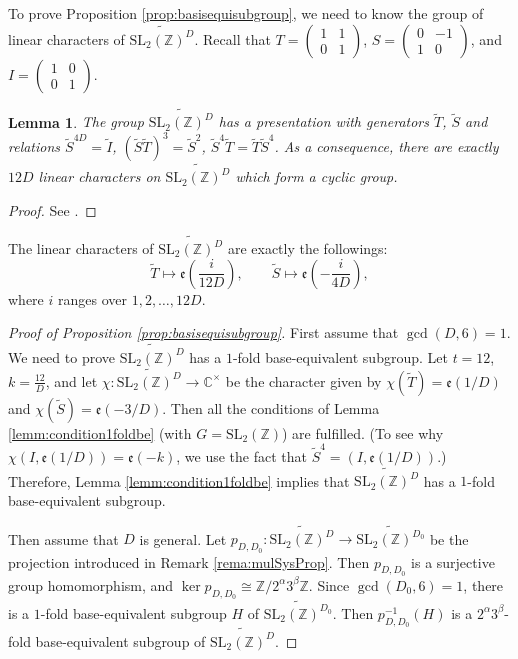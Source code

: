 \documentclass[12pt]{amsart}
\numberwithin{equation}{section}
\theoremstyle{plain}
\newtheorem{lemm}[thm]{Lemma}
\theoremstyle{definition}
\theoremstyle{remark}
\newcommand\tbtmat[4]{\left(\begin{smallmatrix}{#1} & {#2} \\ {#3} & {#4}\end{smallmatrix}\right)}
\newcommand\etp[1]{\mathfrak{e}\left(#1\right)}
\newcommand\numZ{\mathbb{Z}}
\newcommand\numC{\mathbb{C}}
\newcommand\slZ{\mathrm{SL}_2(\mathbb{Z})}
\newcommand\Dcover[2]{\widetilde{#1^{#2}}}
\begin{document}
\begin{appendix}
To prove Proposition \ref{prop:basisequisubgroup}, we need to know the group of linear characters of $\Dcover{\slZ}{D}$. Recall that $T=\tbtmat{1}{1}{0}{1}$, $S=\tbtmat{0}{-1}{1}{0}$, and $I=\tbtmat{1}{0}{0}{1}$.
\begin{lemm}{\cite[Lemma 5.2]{Zhu23}}
\label{lemm:presentationslZ}
The group $\Dcover{\slZ}{D}$ has a presentation with generators $\widetilde{T}$, $\widetilde{S}$ and relations $\widetilde{S}^{4D}=\widetilde{I}$, $(\widetilde{S}\widetilde{T})^3=\widetilde{S}^2$, $\widetilde{S}^4\widetilde{T}=\widetilde{T}\widetilde{S}^4$. As a consequence, there are exactly $12D$ linear characters on $\Dcover{\slZ}{D}$ which form a cyclic group.
\end{lemm}
\begin{proof}
See \cite[Lemma 5.2]{Zhu23}.
\end{proof}
The linear characters of $\Dcover{\slZ}{D}$ are exactly the followings:
\begin{equation*}
\widetilde{T}\mapsto \etp{\frac{i}{12D}},\qquad \widetilde{S}\mapsto \etp{-\frac{i}{4D}},
\end{equation*}
where $i$ ranges over $1,2,\dots,12D$.


\begin{proof}[Proof of Proposition \ref{prop:basisequisubgroup}]
First assume that $\gcd(D,6)=1$. We need to prove $\Dcover{\slZ}{D}$ has a $1$-fold base-equivalent subgroup. Let $t=12$, $k=\frac{12}{D}$, and let $\chi\colon\Dcover{\slZ}{D}\rightarrow\numC^\times$ be the character given by $\chi(\widetilde{T})=\etp{1/D}$ and $\chi(\widetilde{S})=\etp{-3/D}$. Then all the conditions of Lemma \ref{lemm:condition1foldbe} (with $G=\slZ$) are fulfilled. (To see why $\chi(I,\etp{1/D})=\etp{-k}$, we use the fact that $\widetilde{S}^4=(I,\etp{1/D})$.) Therefore, Lemma \ref{lemm:condition1foldbe} implies that $\Dcover{\slZ}{D}$ has a $1$-fold base-equivalent subgroup.

Then assume that $D$ is general. Let $p_{D,D_0}\colon\Dcover{\slZ}{D}\rightarrow\Dcover{\slZ}{D_0}$ be the projection introduced in Remark \ref{rema:mulSysProp}. Then $p_{D,D_0}$ is a surjective group homomorphism, and $\ker p_{D,D_0}\cong\numZ/2^\alpha3^\beta\numZ$. Since $\gcd(D_0,6)=1$, there is a $1$-fold base-equivalent subgroup $H$ of $\Dcover{\slZ}{D_0}$. Then $p_{D,D_0}^{-1}(H)$ is a $2^\alpha3^\beta$-fold base-equivalent subgroup of $\Dcover{\slZ}{D}$.
\end{proof}


\end{appendix}
\end{document}
